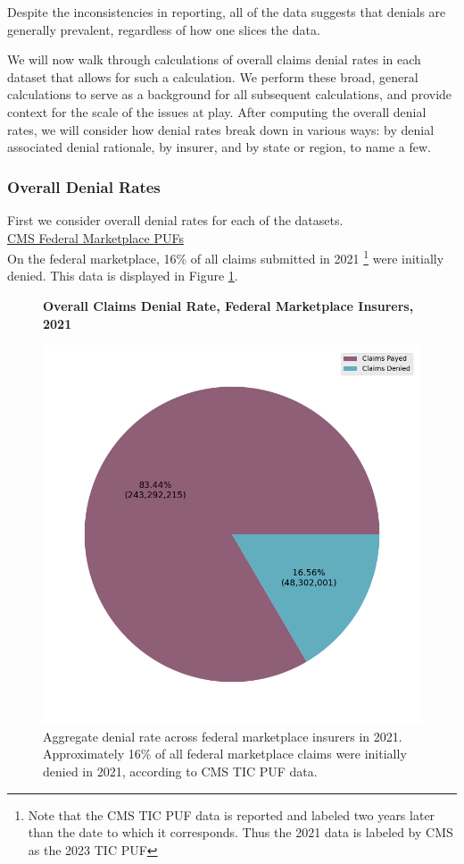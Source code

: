 \documentclass[12pt, a4paper,twoside]{report}
\theoremstyle{plain} %
\theoremstyle{definition} %
\theoremstyle{remark} %
\numberwithin{equation}{chapter}
\begin{document}
		Despite the inconsistencies in reporting, all of the data suggests that denials are generally prevalent, regardless of how one slices the data. 
		
		We will now walk through calculations of overall claims denial rates in each dataset that allows for such a calculation. We perform these broad, general calculations to serve as a background for all subsequent calculations, and provide context for the scale of the issues at play. After computing the overall denial rates, we will consider how denial rates break down in various ways: by denial associated denial rationale, by insurer, and by state or region, to name a few.
		
		\subsubsection{Overall Denial Rates}
		
		First we consider overall denial rates for each of the datasets.\\
		
		\underline{CMS Federal Marketplace PUFs}\\
		
			On the federal marketplace, 16\% of all claims submitted in 2021 \footnote{Note that the CMS TIC PUF data is reported and labeled two years later than the date to which it corresponds. Thus the 2021 data is labeled by CMS as the 2023 TIC PUF} were initially denied. This data is displayed in Figure \ref{federal_denial_rate}.
			
			\begin{figure}[h!]
				\centering
				\textbf{Overall Claims Denial Rate, Federal Marketplace Insurers, 2021}\par\medskip
				\includegraphics[width=.6\columnwidth]{images/cms_puf/overall_denial_pie.png}
				\caption{Aggregate denial rate across federal marketplace insurers in 2021. Approximately 16\% of all federal marketplace claims were initially denied in 2021, according to CMS TIC PUF data.}
				\label{federal_denial_rate}
			\end{figure}
		\clearpage
	
\end{document}
